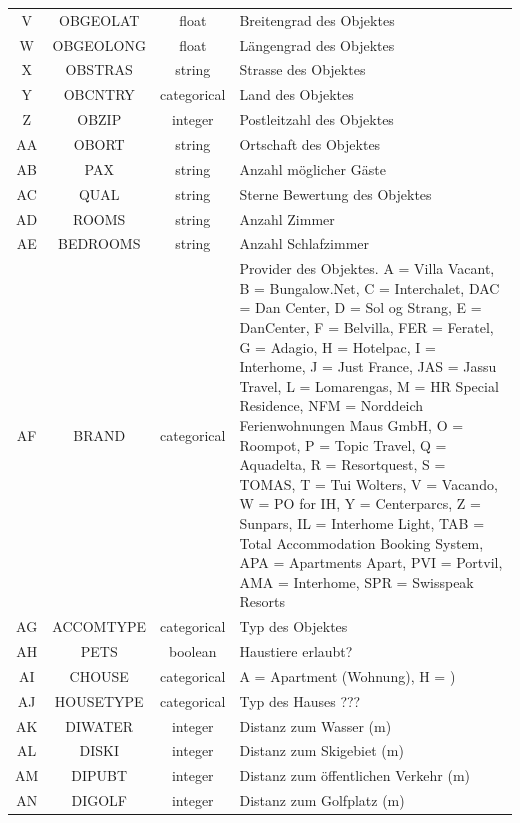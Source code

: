 \begin{longtable}{ | c | c | c | L{7.5cm} | }
	 \\ \hline
	V & OBGEOLAT & float & Breitengrad des Objektes \\ \hline 
	W & OBGEOLONG & float & Längengrad des Objektes \\ \hline 
	X & OBSTRAS & string & Strasse des Objektes \\ \hline 
	Y & OBCNTRY & categorical & Land des Objektes \\ \hline 
	Z & OBZIP & integer & Postleitzahl des Objektes \\ \hline 
	AA & OBORT & string & Ortschaft des Objektes \\ \hline 
	AB & PAX & string & Anzahl möglicher Gäste \\ \hline 
	AC & QUAL & string & Sterne Bewertung des Objektes \\ \hline 
	AD & ROOMS & string & Anzahl Zimmer \\ \hline 
	AE & BEDROOMS & string & Anzahl Schlafzimmer \\ \hline 
	AF & BRAND & categorical & Provider des Objektes. A = Villa Vacant, B = Bungalow.Net, C = Interchalet, DAC = Dan Center, D = Sol og Strang, E = DanCenter, F = Belvilla, FER = Feratel, G = Adagio, H = Hotelpac, I = Interhome, J = Just France, JAS = Jassu Travel, L = Lomarengas, M = HR Special Residence, NFM = Norddeich Ferienwohnungen Maus GmbH, O = Roompot, P = Topic Travel, Q = Aquadelta, R = Resortquest, S = TOMAS, T = Tui Wolters, V = Vacando, W = PO for IH, Y = Centerparcs, Z = Sunpars, IL = Interhome Light, TAB = Total Accommodation Booking System, APA = Apartments Apart, PVI = Portvil, AMA = Interhome, SPR = Swisspeak Resorts\\ \hline 
	AG & ACCOMTYPE & categorical & Typ des Objektes\\ \hline 
	AH & PETS & boolean & Haustiere erlaubt? \\ \hline 
	AI & CHOUSE & categorical & A = Apartment (Wohnung), H = ) \\ \hline 
	AJ & HOUSETYPE & categorical & Typ des Hauses ??? \\ \hline 
	AK & DIWATER & integer & Distanz zum Wasser (m) \\ \hline 
	AL & DISKI & integer & Distanz zum Skigebiet (m) \\ \hline 
	AM & DIPUBT & integer & Distanz zum öffentlichen Verkehr (m) \\ \hline 
	AN & DIGOLF & integer & Distanz zum Golfplatz (m) \\ \hline 

\end{longtable}
